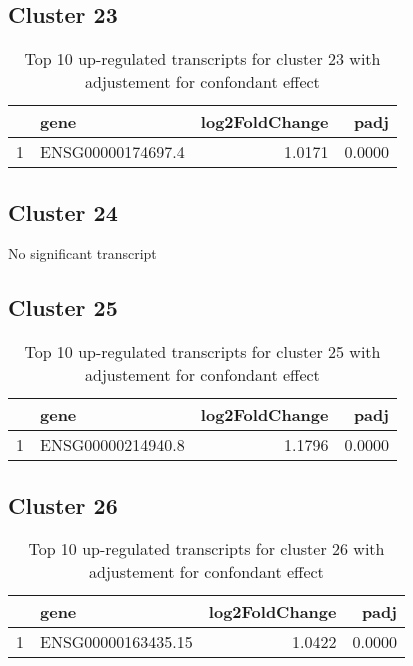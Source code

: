 \documentclass{article}
\begin{document}
\subsection{Cluster 23 }
\begin{table}[H]
\centering
\begin{tabular}{rlrr}
  \hline
 & gene & log2FoldChange & padj \\ 
  \hline
1 & ENSG00000174697.4 & 1.0171 & 0.0000 \\ 
   \hline
\end{tabular}
\caption{Top 10 up-regulated transcripts for cluster 23 with adjustement for confondant effect} 
\label{tab:q3_1_conf_23}
\end{table}
\subsection{Cluster 24 }
No significant transcript
\subsection{Cluster 25 }
\begin{table}[H]
\centering
\begin{tabular}{rlrr}
  \hline
 & gene & log2FoldChange & padj \\ 
  \hline
1 & ENSG00000214940.8 & 1.1796 & 0.0000 \\ 
   \hline
\end{tabular}
\caption{Top 10 up-regulated transcripts for cluster 25 with adjustement for confondant effect} 
\label{tab:q3_1_conf_25}
\end{table}
\subsection{Cluster 26 }
\begin{table}[H]
\centering
\begin{tabular}{rlrr}
  \hline
 & gene & log2FoldChange & padj \\ 
  \hline
1 & ENSG00000163435.15 & 1.0422 & 0.0000 \\ 
   \hline
\end{tabular}
\caption{Top 10 up-regulated transcripts for cluster 26 with adjustement for confondant effect} 
\label{tab:q3_1_conf_26}
\end{table}
\end{document}
